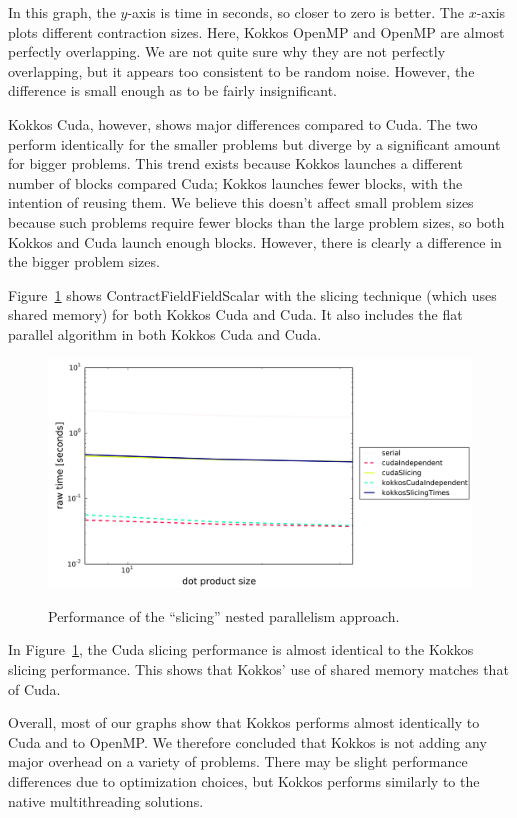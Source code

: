 In this graph, the $y$-axis is time in seconds, so closer to zero is better. The
$x$-axis plots different contraction sizes.  Here, Kokkos OpenMP and OpenMP are
almost perfectly overlapping. We are not quite sure why they are not perfectly
overlapping, but it appears too consistent to be random noise. However, the
difference is small enough as to be fairly insignificant. 

Kokkos Cuda, however, shows major differences compared to Cuda. The two perform
identically for the smaller problems but diverge by a significant amount for
bigger problems. This trend exists because Kokkos launches a different number of
blocks compared Cuda; Kokkos launches fewer blocks, with the intention of
reusing them.  We believe this doesn't affect small problem sizes because such
problems require fewer blocks than the large problem sizes, so both Kokkos and
Cuda launch enough blocks.  However, there is clearly a difference in the bigger
problem sizes. 

Figure~\ref{fig:cffscomparison} shows ContractFieldFieldScalar with the slicing
technique (which uses shared memory) for both Kokkos Cuda and Cuda.  It also
includes the flat parallel algorithm in both Kokkos Cuda and Cuda.

\begin{figure}[!ht]
{\includegraphics[scale=.8]{CFFS_RawTimes_LargestSize2.png}}
\caption[ContractFieldFieldScalar Kokkos performance comparison]{
    Performance of the ``slicing'' nested parallelism approach.}
\label{fig:cffscomparison}
\end{figure}

In Figure~\ref{fig:cffscomparison}, the Cuda slicing performance is almost
identical to the Kokkos slicing performance. This shows that Kokkos' use of
shared memory matches that of Cuda.

Overall, most of our graphs show that Kokkos performs almost identically to Cuda
and to OpenMP.  We therefore concluded that Kokkos is not adding any major
overhead on a variety of problems. 
There may be slight performance differences due to optimization choices, but
Kokkos performs similarly to the native multithreading solutions.

